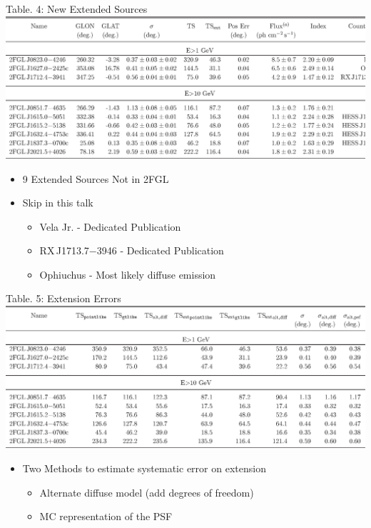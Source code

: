 \documentclass[12pt]{beamer}
\begin{document}
\begin{frame}{Table. 4: New Extended Sources}
  \includegraphics[scale=0.45]{tables/table4.eps}
  \begin{itemize}
    \item 9 Extended Sources Not in 2FGL
    \item Skip in this talk
      \begin{itemize}
        \item Vela Jr. - Dedicated Publication
        \item RX\,J1713.7$-$3946 - Dedicated Publication
        \item Ophiuchus - Most likely diffuse emission
      \end{itemize}
  \end{itemize}
\end{frame}

\begin{frame}{Table. 5: Extension Errors}
    \includegraphics[scale=0.5]{tables/table5.eps}
    \begin{itemize}
      \item Two Methods to estimate systematic error on extension
    \begin{itemize}
      \item Alternate diffuse model (add degrees of freedom)
      \item MC representation of the PSF
    \end{itemize}
    \end{itemize}
\end{frame}
\end{document}
